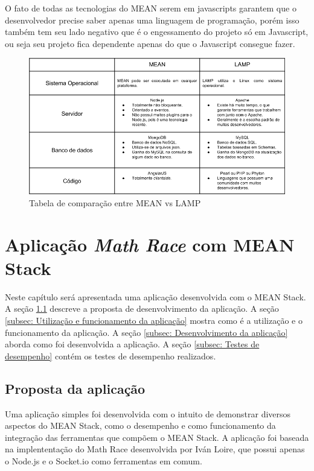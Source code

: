     O fato de todas as tecnologias do MEAN serem em javascripts garantem que o desenvolvedor precise saber apenas uma linguagem de programação, porém isso também tem seu lado negativo que é o engessamento do projeto só em Javascript, ou seja seu projeto fica dependente apenas do que o Javascript consegue fazer.
    
    \begin{figure}[htb]
    \centering
    \includegraphics[scale=0.5]{images/mean_vs_lamp.png}
    \caption{Tabela de comparação entre MEAN vs LAMP}
    \label{fig:tabela mean vs lamp}
    \end{figure}
   
\section{Aplicação \textit{Math Race} com MEAN Stack}

Neste capítulo será apresentada uma aplicação desenvolvida com o MEAN Stack. A seção \ref{subsec: Proposta de desenvolvimento} descreve a proposta de desenvolvimento da aplicação. A seção \ref{subsec: Utilização e funcionamento da aplicação} mostra como é a utilização e o funcionamento da aplicação. A seção \ref{subsec: Desenvolvimento da aplicação} aborda como foi desenvolvida a aplicação. A seção \ref{subsec: Testes de desempenho} contém os testes de desempenho realizados.

\subsection{Proposta da aplicação}
\label{subsec: Proposta de desenvolvimento}
 Uma aplicação simples foi desenvolvida com o intuito de demonstrar diversos aspectos do MEAN Stack, como o desempenho e como funcionamento da integração das ferramentas que compõem o MEAN Stack. A aplicação foi baseada na implententação do Math Race desenvolvida por Iván Loire\cite{MathRace}, que possui apenas o Node.js e o Socket.io como ferramentas em comum.

